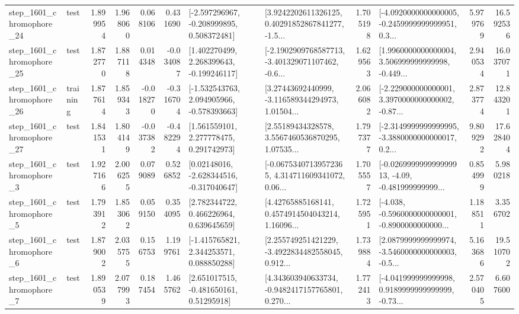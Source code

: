 \begin{tabular}{llrrrrllrlrr}
 step\_1601\_chromophore\_24 &      test &      1.899954 &    1.968060 &      0.068106 &  0.431690 &   [-2.597296967, -0.208999895, 0.508372481] &  [3.9242202611326125, 0.40291852867841277, -1.5... &       1.705198 &  [-4.0920000000000005, -0.2459999999999951, 0.3... &            5.979769 &         16.592536 \\
 step\_1601\_chromophore\_25 &      test &      1.872770 &    1.887118 &      0.014348 & -0.034087 &    [1.402270499, 2.268399643, -0.199246117] &  [-2.1902909768587713, -3.401329071107462, -0.6... &       1.629563 &  [1.9960000000000004, 3.506999999999998, -0.449... &            2.940534 &         16.037071 \\
 step\_1601\_chromophore\_26 &  training &      1.877614 &    1.859343 &     -0.018270 & -0.316704 &   [-1.532543763, 2.094905966, -0.578393663] &  [3.27443692440999, -3.116589344294973, 1.01504... &       2.066082 &  [-2.229000000000001, 3.3970000000000002, -0.87... &            2.873774 &         12.843201 \\
 step\_1601\_chromophore\_27 &      test &      1.841531 &    1.804149 &     -0.037382 & -0.482294 &     [1.561559101, 2.277778475, 0.291742973] &  [2.55189434328578, 3.5567460536870295, 1.07535... &       1.797377 &  [-2.3149999999999995, -3.3880000000000017, 0.2... &            9.809292 &         17.628404 \\
  step\_1601\_chromophore\_3 &      test &      1.927166 &    2.006255 &      0.079089 &  0.526852 &    [0.02148016, -2.628344516, -0.317040647] &  [-0.06753407139572365, 4.314711609341072, 0.06... &       1.705557 &  [-0.026999999999999913, -4.09, -0.481999999999... &            0.854999 &          5.980218 \\
  step\_1601\_chromophore\_5 &      test &      1.793912 &    1.853062 &      0.059150 &  0.354095 &     [2.782344722, 0.466226964, 0.639645659] &  [4.42765885168141, 0.4574914504043214, 1.16096... &       1.725951 &  [-4.038, -0.5960000000000001, -0.8900000000000... &            1.188511 &          3.356702 \\
  step\_1601\_chromophore\_6 &      test &      1.879002 &    2.035755 &      0.156753 &  1.199761 &    [-1.415765821, 2.344253571, 0.088850288] &  [2.255749251421229, -3.4922834482558045, 0.912... &       1.739884 &  [2.0879999999999974, -3.5460000000000003, -0.5... &            5.163686 &         19.510702 \\
  step\_1601\_chromophore\_7 &      test &      1.890539 &    2.077993 &      0.187454 &  1.465762 &     [2.651017515, -0.481650161, 0.51295918] &  [4.343603940633734, -0.9482417157765801, 0.270... &       1.772413 &  [-4.041999999999998, 0.9189999999999999, -0.73... &            2.570405 &          6.607600 \\

\end{tabular}
